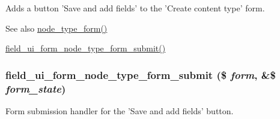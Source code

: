 Adds a button 'Save and add fields' to the 'Create content type' form.

\begin{DoxySeeAlso}{See also}
\hyperlink{group__forms_ga488f2cb519f924aa0bd9579d9bb0db49}{node\_\-type\_\-form()} 

\hyperlink{field__ui_8module_a2a1b80b334d159a9222056d932317ec7}{field\_\-ui\_\-form\_\-node\_\-type\_\-form\_\-submit()} 
\end{DoxySeeAlso}
\hypertarget{field__ui_8module_a2a1b80b334d159a9222056d932317ec7}{
\subsubsection[{field\_\-ui\_\-form\_\-node\_\-type\_\-form\_\-submit}]{\setlength{\rightskip}{0pt plus 5cm}field\_\-ui\_\-form\_\-node\_\-type\_\-form\_\-submit (\$ {\em form}, \/  \&\$ {\em form\_\-state})}}
\label{field__ui_8module_a2a1b80b334d159a9222056d932317ec7}
Form submission handler for the 'Save and add fields' button.

